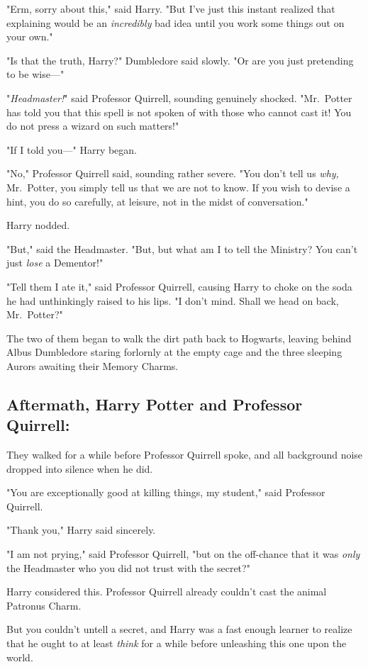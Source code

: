"Erm, sorry about this," said Harry. "But I've just this instant realized that
explaining would be an \emph{incredibly} bad idea until you work some things
out on your own."

"Is that the truth, Harry?" Dumbledore said slowly. "Or are you just pretending
to be wise\mbox{---}"

"\emph{Headmaster!}" said Professor Quirrell, sounding genuinely shocked.
"Mr.~Potter has told you that this spell is not spoken of with those who cannot
cast it! You do not press a wizard on such matters!"

"If I told you\mbox{---}" Harry began.

"No," Professor Quirrell said, sounding rather severe. "You don't tell us
\emph{why,} Mr.~Potter, you simply tell us that we are not to know. If you wish
to devise a hint, you do so carefully, at leisure, not in the midst of
conversation."

Harry nodded.

"But," said the Headmaster. "But, but what am I to tell the Ministry? You can't
just \emph{lose} a Dementor!"

"Tell them I ate it," said Professor Quirrell, causing Harry to choke on the
soda he had unthinkingly raised to his lips. "I don't mind. Shall we head on
back, Mr.~Potter?"

The two of them began to walk the dirt path back to Hogwarts, leaving behind
Albus Dumbledore staring forlornly at the empty cage and the three sleeping
Aurors awaiting their Memory Charms.
\sbreak
\vspace{-2\baselineskip}
\subsection{Aftermath, Harry Potter and Professor Quirrell:}

They walked for a while before Professor Quirrell spoke, and all background
noise dropped into silence when he did.

"You are exceptionally good at killing things, my student," said Professor
Quirrell.

"Thank you," Harry said sincerely.

"I am not prying," said Professor Quirrell, "but on the off-chance that it was
\emph{only} the Headmaster who you did not trust with the secret{\el}?"

Harry considered this. Professor Quirrell already couldn't cast the animal
Patronus Charm.

But you couldn't untell a secret, and Harry was a fast enough learner to
realize that he ought to at least \emph{think} for a while before unleashing
this one upon the world.

